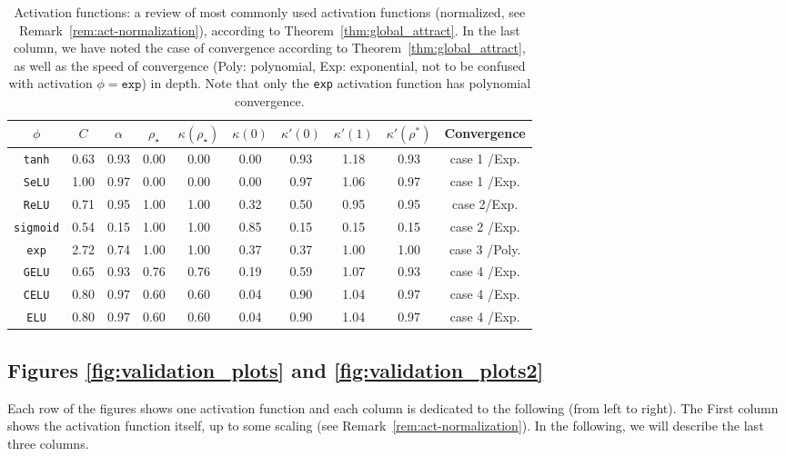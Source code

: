\documentclass[twoside]{article}
\theoremstyle{definition}
\begin{document}
\begin{table}[ht]
\centering
\renewcommand{\arraystretch}{1.3}
\begin{tabular}{|c|c|c|c|c|c|c|c|c|c| }
\toprule
$\phi$ & $C$ & $\alpha$ & $\rho_\star$ & $\kappa(\rho_\star)$ & $\kappa(0)$ & $\kappa'(0)$ & $\kappa'(1)$ & $\kappa'(\rho^*)$ & Convergence \\ \midrule 
\texttt{tanh} &0.63 &0.93 &0.00 &0.00 &0.00 &0.93 &1.18 &0.93 &case 1 /Exp.\\ 
\texttt{SeLU} &1.00 &0.97 &0.00 &0.00 &0.00 &0.97 &1.06 &0.97 &case 1 /Exp.\\ 
\texttt{ReLU} &0.71 &0.95 &1.00 &1.00 &0.32 &0.50 &0.95 &0.95 &case 2/Exp.\\ 
\texttt{sigmoid} &0.54 &0.15 &1.00 &1.00 &0.85 &0.15 &0.15 &0.15 &case 2 /Exp. \\ 
\texttt{exp} &2.72 &0.74 &1.00 &1.00 &0.37 &0.37 &1.00 &1.00 &case 3 /Poly.\\ 
\texttt{GELU} &0.65 &0.93 &0.76 &0.76 &0.19 &0.59 &1.07 &0.93 &case 4 /Exp. \\ 
\texttt{CELU} &0.80 &0.97 &0.60 &0.60 &0.04 &0.90 &1.04 &0.97 &case 4 /Exp.\\ 
\texttt{ELU} &0.80 &0.97 &0.60 &0.60 &0.04 &0.90 &1.04 &0.97 &case 4 /Exp.\\ 
\bottomrule
\end{tabular}
\caption{Activation functions: a review of most commonly used activation functions (normalized, see Remark~\ref{rem:act-normalization}), according to Theorem~\ref{thm:global_attract}. In the last column, we have noted the case of convergence according to Theorem~\ref{thm:global_attract}, as well as the speed of convergence (Poly: polynomial, Exp: exponential, not to be confused with  activation $\phi=\texttt{exp}$) in depth. Note that only the \texttt{exp} activation function has polynomial convergence.}
\label{tab:activation_stats}
\end{table}

\subsection{Figures \ref{fig:validation_plots} and \ref{fig:validation_plots2}}
Each row of the figures shows one activation function and each column is dedicated to the following (from left to right). The First column shows the activation function itself, up to some scaling (see Remark~\ref{rem:act-normalization}). In the following, we will describe the last three columns. 
\end{document}
